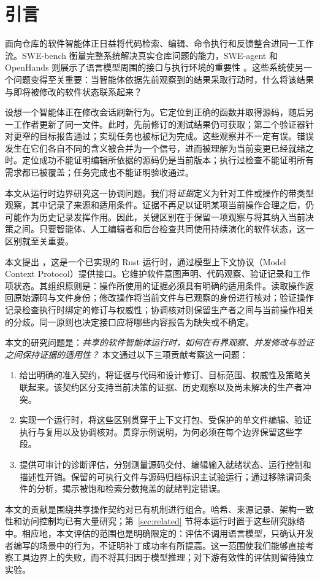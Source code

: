 \section{引言}
\label{sec:introduction}
面向仓库的软件智能体正日益将代码检索、编辑、命令执行和反馈整合进同一工作流。SWE-bench 衡量完整系统解决真实仓库问题的能力，SWE-agent 和 OpenHands 则展示了语言模型周围的接口与执行环境的重要性 \cite{jimenez2024swebench,yang2024sweagent,wang2025openhands}。这些系统使另一个问题变得至关重要：当智能体依据先前观察到的结果采取行动时，什么将该结果与即将被修改的软件状态联系起来？

设想一个智能体正在修改会话刷新行为。它定位到正确的函数并取得源码，随后另一工作者更新了同一文件。此时，先前修订的测试结果仍可获取；第二个验证器针对更窄的目标报告通过；实现任务也被标记为完成。这些观察并不一定有误。错误发生在它们各自不同的含义被合并为一个信号，进而被理解为当前变更已经就绪之时。定位成功不能证明编辑所依据的源码仍是当前版本；执行过检查不能证明所有需求都已被覆盖；任务完成也不能证明验收通过。

本文从运行时边界研究这一协调问题。我们将\emph{证据}定义为针对工件或操作的带类型观察，其中记录了来源和适用条件。证据不再足以证明某项当前操作合理之后，仍可能作为历史记录发挥作用。因此，关键区别在于保留一项观察与将其纳入当前决策之间。只要智能体、人工编辑者和后台检查共同使用持续演化的软件状态，这一区别就至关重要。

本文提出 \wcode{}，这是一个已实现的 Rust 运行时，通过模型上下文协议（Model Context Protocol）提供接口。它维护软件意图声明、代码观察、验证记录和工作项状态。其组织原则是：操作所使用的证据必须具有明确的适用条件。读取操作返回原始源码与文件身份；修改操作将当前文件与已观察的身份进行核对；验证操作记录检查执行时绑定的修订与权威性；协调核对则保留生产者之间与当前操作相关的分歧。同一原则也决定接口应将哪些内容报告为缺失或不确定。

本文的研究问题是：\emph{共享的软件智能体运行时，如何在有界观察、并发修改与验证之间保持证据的适用性？} 本文通过以下三项贡献考察这一问题：
\begin{enumerate}
\item 给出明确的准入契约，将证据与代码和设计修订、目标范围、权威性及策略关联起来。该契约区分支持当前决策的证据、历史观察以及尚未解决的生产者冲突。
\item 实现一个运行时，将这些区别贯穿于上下文打包、受保护的单文件编辑、验证执行与复用以及协调核对。贯穿示例说明，为何必须在每个边界保留这些字段。
\item 提供可审计的诊断评估，分别测量源码交付、编辑输入就绪状态、运行控制和描述性开销。保留的可执行文件与源码归档标识主试验运行；通过移除谓词条件的分析，揭示被饱和检索分数掩盖的就绪判定错误。
\end{enumerate}

本文的贡献是围绕共享操作契约对已有机制进行组合。哈希、来源记录、架构一致性和访问控制均已有大量研究；第~\ref{sec:related} 节将本运行时置于这些研究脉络中。相应地，本文评估的范围也是明确限定的：评估不调用语言模型，只确认开发者编写的场景中的行为，不证明补丁成功率有所提高。这一范围使我们能够直接考察工具边界上的失败，而不将其归因于模型推理；对下游有效性的评估则留待独立实验。
